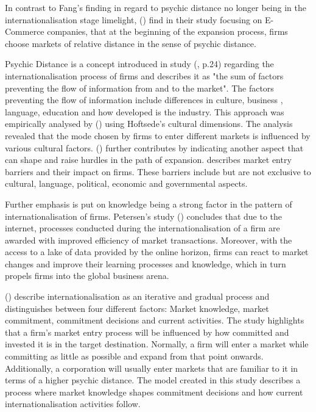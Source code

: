 \documentclass[11pt,a4paper]{article}
\begin{document}
In contrast to Fang's finding in regard to psychic distance no longer being in the internationalisation stage limelight, \citeauthor{forsgrenIgnorantImpatientInternationalization2007} (\citeyear{forsgrenIgnorantImpatientInternationalization2007})  find in their study focusing on E-Commerce companies, that at the beginning of the expansion process, firms choose markets of relative distance in the sense of psychic distance. \par
Psychic Distance is a concept introduced in \citeauthor{johansonInternationalizationProcessFirm1977}  study (\citeyear{johansonInternationalizationProcessFirm1977}, p.24) regarding the internationalisation process of firms and describes it as "the sum of factors preventing the flow of information from and to the market". The factors preventing the flow of information include differences in culture, business , language, education and how developed is the industry.  This approach was empirically analysed by \citeauthor{kogutEffectNationalCulture1988} (\citeyear{kogutEffectNationalCulture1988}) using Hoftsede's cultural dimensions. The analysis revealed that the mode chosen by firms to enter different markets is influenced by various cultural factors. 
\citeauthor{karakayaBarriersEntryInternational1993} (\citeyear{karakayaBarriersEntryInternational1993}) further contributes  by indicating another aspect that can shape and raise hurdles in the path of expansion. \citeauthor{karakayaBarriersEntryInternational1993} describes market entry barriers and their impact on firms. These barriers include but are not exclusive to cultural, language, political, economic and governmental aspects. \par
Further emphasis is put on knowledge being a strong factor in the pattern of internationalisation of firms. Petersen's study (\citeyear{petersenInternetForeignMarket2002}) concludes that due to the internet, processes conducted during the internationalisation of a firm are awarded with improved efficiency of market transactions. Moreover, with the access to a lake of data provided by the online horizon, firms can react to market changes and improve their learning processes and knowledge, which in turn propels firms into the global business arena. \par 
\citeauthor{johansonInternationalizationProcessFirm1977} (\citeyear{johansonInternationalizationProcessFirm1977}) describe internationalisation as an iterative and gradual process and distinguishes between four different factors: Market knowledge, market commitment, commitment decisions and current activities. The study highlights that a firm's market entry process will be influenced by how committed and invested it is in the target destination. Normally, a firm will enter a market while committing as little as possible and expand from that point onwards. Additionally, a corporation will usually enter markets that are familiar to it in terms of a higher psychic distance. The model created in this study describes a process where market knowledge shapes commitment decisions and how current internationalisation activities follow.  \par
\end{document}
